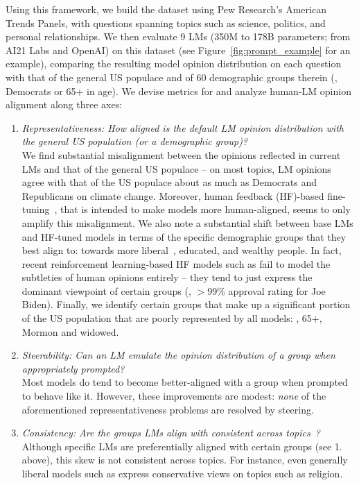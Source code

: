 Using this framework, we build the \bname dataset using Pew Research's American Trends Panels, with \nquestions{} questions
spanning topics such as science, politics, and personal relationships.
We then evaluate 9 LMs (350M to 178B parameters; from AI21 Labs and OpenAI) on this dataset (see Figure~\ref{fig:prompt_example} for an example), comparing the resulting model opinion distribution on each question with that of the general US populace and of 60 demographic groups therein (\eg, Democrats or 65+ in age). 
We devise metrics for and analyze human-LM opinion alignment along three axes:
\begin{enumerate}
  \item \emph{Representativeness: How aligned is the default LM opinion distribution with the general US population (or a demographic group)?} \\
    We find substantial misalignment between the opinions reflected in current LMs and that of the general US populace -- on most topics, LM opinions agree with that of the US populace about as much as Democrats and Republicans on climate change.
    Moreover, human feedback (HF)-based fine-tuning~\citep{ouyang2022training,ai21instructbeta}, that is intended to make models more human-aligned, seems to only amplify this misalignment.
    We also note a substantial shift between base LMs and HF-tuned models in terms of the specific demographic groups that they best align to: towards more liberal~\citep{perez2022discovering,hartmann2023political}, educated, and wealthy people.
    In fact, recent reinforcement learning-based HF models such as  fail to model the subtleties of human opinions entirely -- they tend to just express the dominant viewpoint of certain groups (\eg, $>$99\% approval rating for Joe Biden).
    Finally, we identify certain groups that make up a significant portion of the US population that are poorly represented by all models: \eg, 65+, Mormon and widowed.

  \item \emph{Steerability: Can an LM emulate the opinion distribution of a group  when appropriately prompted?} \\
    Most models do tend to become better-aligned with a group when prompted to behave like it. However, these improvements are modest: \emph{none} of the aforementioned representativeness problems are resolved by steering.

  \item \emph{Consistency: Are the groups LMs align with consistent across topics~\citep{saris2004studies}?} \\
  Although specific LMs are preferentially aligned with certain groups (see 1.\@\xspace above), this skew is not consistent across topics.
  For instance, even generally liberal models such as  express conservative views on topics such as religion.
\end{enumerate}

